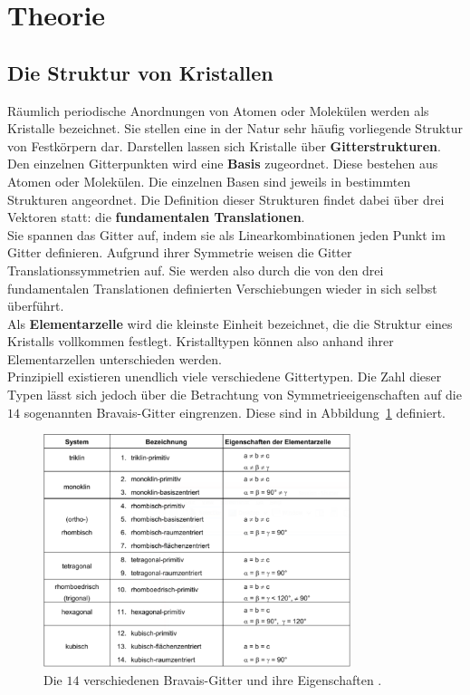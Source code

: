 \section{Theorie}
\label{sec:theorie}
%
\subsection{Die Struktur von Kristallen}
%
Räumlich periodische Anordnungen von Atomen oder Molekülen werden als Kristalle bezeichnet. Sie stellen eine
in der Natur sehr häufig vorliegende Struktur von Festkörpern dar. Darstellen lassen sich Kristalle über
\textbf{Gitterstrukturen}. Den einzelnen Gitterpunkten wird eine \textbf{Basis} zugeordnet. Diese bestehen
aus Atomen oder Molekülen. Die einzelnen Basen sind jeweils in bestimmten Strukturen angeordnet. Die Definition
dieser Strukturen findet dabei über drei Vektoren statt: die \textbf{fundamentalen Translationen}.\\
Sie spannen das Gitter auf, indem sie als Linearkombinationen jeden Punkt im Gitter definieren. Aufgrund ihrer
Symmetrie weisen die Gitter Translationssymmetrien auf. Sie werden also durch die von den drei fundamentalen
Translationen definierten Verschiebungen wieder in sich selbst überführt.\\
Als \textbf{Elementarzelle} wird die kleinste Einheit bezeichnet, die die Struktur eines Kristalls vollkommen
festlegt. Kristalltypen können also anhand ihrer Elementarzellen unterschieden werden.\\
Prinzipiell existieren unendlich viele verschiedene Gittertypen. Die Zahl dieser Typen lässt sich jedoch über
die Betrachtung von Symmetrieeigenschaften auf die $14$ sogenannten Bravais-Gitter eingrenzen. Diese sind in
Abbildung~\ref{fig:bravais} definiert.
%
\begin{figure}[htb]
  \centering
  \includegraphics[width=0.8\textwidth]{figures/plot_bravais.pdf}
  \caption{Die $14$ verschiedenen Bravais-Gitter und ihre Eigenschaften \cite{V41}.}
  \label{fig:bravais}
\end{figure}
%
